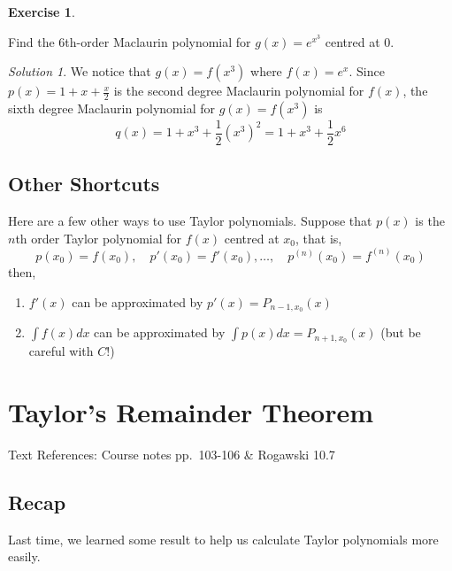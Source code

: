 \documentclass[
]{book}
\providecommand{\tightlist}{%
  \setlength{\itemsep}{0pt}\setlength{\parskip}{0pt}}
\theoremstyle{definition}
\theoremstyle{definition}
\theoremstyle{definition}
\newtheorem{exercise}{Exercise}[chapter]
\theoremstyle{definition}
\theoremstyle{remark}
\newtheorem*{solution}{Solution}
\begin{document}
\begin{exercise}
\protect\hypertarget{exr:unlabeled-div-157}{}\label{exr:unlabeled-div-157}

Find the 6th-order Maclaurin polynomial for \(g(x)=e^{x^3}\) centred at \(0\).

\end{exercise}

\begin{solution}

We notice that \(g(x)=f(x^3)\) where \(f(x)=e^x\). Since \(p(x)=1+x+\frac{x}{2}\) is the second degree Maclaurin polynomial for \(f(x)\), the sixth degree Maclaurin polynomial for \(g(x)=f(x^3)\) is \[q(x)= 1+x^3+\frac{1}{2}(x^3)^2 = 1+ x^3+\frac{1}{2}x^6\]

\end{solution}

\hypertarget{other-shortcuts}{%
\section{Other Shortcuts}\label{other-shortcuts}}

Here are a few other ways to use Taylor polynomials. Suppose that \(p(x)\) is the \(n\)th order Taylor polynomial for \(f(x)\) centred at \(x_0\), that is, \[p(x_0)=f(x_0), \quad p'(x_0)=f'(x_0), \ldots, \quad p^{(n)}(x_0)=f^{(n)}(x_0)\]
then,

\begin{enumerate}
\def\labelenumi{\arabic{enumi}.}
\tightlist
\item
  \(f'(x)\) can be approximated by \(p'(x)=P_{n-1,x_0}(x)\)
\item
  \(\displaystyle \int f(x)dx\) can be approximated by \(\displaystyle \int p(x)dx = P_{n+1,x_0}(x)\) (but be careful with \(C\)!)
\end{enumerate}

\hypertarget{lec-22}{%
\chapter{Taylor's Remainder Theorem}\label{lec-22}}

Text References: Course notes pp.~103-106 \& Rogawski 10.7

\hypertarget{recap-20}{%
\section{Recap}\label{recap-20}}

Last time, we learned some result to help us calculate Taylor polynomials more easily.
\end{document}
